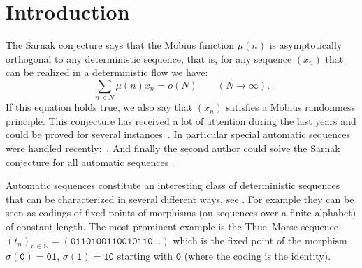 \documentclass[12pt]{amsart}
\begin{document}
\section{Introduction}
The Sarnak conjecture \cite{Sarnak2011,Sarnak2012} says that the M\"obius function $\mu(n)$ is asymptotically orthogonal to any deterministic sequence, 
that is, for any sequence $(x_n)$
that can be realized in a deterministic flow we have:
\begin{equation}\label{eqMRP}
\sum_{n< N} \mu(n)x_n = o(N) \qquad (N\to\infty).
\end{equation}
If this equation holds true, we also say that $(x_n)$ satisfies a M\"obius randomness principle.
This conjecture has received a lot of attention during the last years and could be proved for several instances~\cite{Bourgain2013a, Bourgain2013, BSZ2013,
Davenport1937,DK2015, FM2015, Green2012, GT2012, EKL2016, HKLD2014, ELD2014, ELD2015, HLD2015, Karagulyan2015, KL2015, LS2015, Peckner2015, SU2015, Veech2016}.
In particular special automatic sequences were handled recently:~\cite{DT2005, DDM2015, Drmota2014, FKLM2016, Hanna2017, Katai2001, Katai1986, MR2010, MR2015}.
And finally the second author could solve the Sarnak conjecture for all automatic sequences \cite{Muellner2017}.

Automatic sequences constitute an interesting class of deterministic sequences that 
can be characterized in several different ways, see \cite{AS2003}.
For example they can be seen as codings of fixed points of morphisms (on sequences over a finite alphabet) of constant length.
The most prominent example is the Thue--Morse sequence 
$(t_n)_{n\in\mathbb{N}} = 
({\mathtt{0}}{\mathtt{1}}{\mathtt{1}}{\mathtt{0}}{\mathtt{1}}{\mathtt{0}}{\mathtt{0}}{\mathtt{1}}{\mathtt{1}}{\mathtt{0}}{\mathtt{0}}{\mathtt{1}}{\mathtt{0}}{\mathtt{1}}{\mathtt{1}}{\mathtt{0}}\ldots)$ which
is the fixed point of the morphism $\sigma({\mathtt{0}}) = {\mathtt{0}}{\mathtt{1}}$, $\sigma({\mathtt{1}}) = {\mathtt{1}}{\mathtt{0}}$ starting with ${\mathtt{0}}$ (where the coding is the identity).
\end{document}
